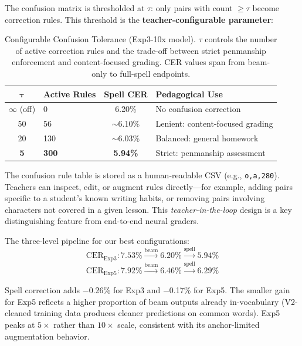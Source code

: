\documentclass[conference]{IEEEtran}
\begin{document}
The confusion matrix is thresholded at $\tau$: only pairs with count $\geq \tau$ become correction rules. This threshold is the \textbf{teacher-configurable parameter}:

\begin{table}[h]
\centering
\caption{Configurable Confusion Tolerance (Exp3-10x model). $\tau$ controls the number of active correction rules and the trade-off between strict penmanship enforcement and content-focused grading. CER values span from beam-only to full-spell endpoints.}
\label{tab:tolerance}
\begin{tabular}{@{}clcl@{}}
\toprule
$\boldsymbol{\tau}$ & \textbf{Active Rules} & \textbf{Spell CER} & \textbf{Pedagogical Use} \\
\midrule
$\infty$ (off) & 0   & 6.20\% & No confusion correction \\
50             & 56  & $\sim$6.10\% & Lenient: content-focused grading \\
20             & 130 & $\sim$6.03\% & Balanced: general homework \\
\textbf{5}     & \textbf{300} & \textbf{5.94\%} & Strict: penmanship assessment \\
\bottomrule
\end{tabular}
\end{table}

The confusion rule table is stored as a human-readable CSV (e.g., \texttt{o,a,280}). Teachers can inspect, edit, or augment rules directly---for example, adding pairs specific to a student's known writing habits, or removing pairs involving characters not covered in a given lesson. This \emph{teacher-in-the-loop} design is a key distinguishing feature from end-to-end neural graders.

The three-level pipeline for our best configurations:
\begin{equation}
  \text{CER}_{\text{Exp3}}: 7.53\% \xrightarrow{\text{beam}} 6.20\% \xrightarrow{\text{spell}} 5.94\%
\end{equation}
\begin{equation}
  \text{CER}_{\text{Exp5}}: 7.92\% \xrightarrow{\text{beam}} 6.46\% \xrightarrow{\text{spell}} 6.29\%
\end{equation}

Spell correction adds $-$0.26\% for Exp3 and $-$0.17\% for Exp5. The smaller gain for Exp5 reflects a higher proportion of beam outputs already in-vocabulary (V2-cleaned training data produces cleaner predictions on common words). Exp5 peaks at $5\times$ rather than $10\times$ scale, consistent with its anchor-limited augmentation behavior.
\end{document}

